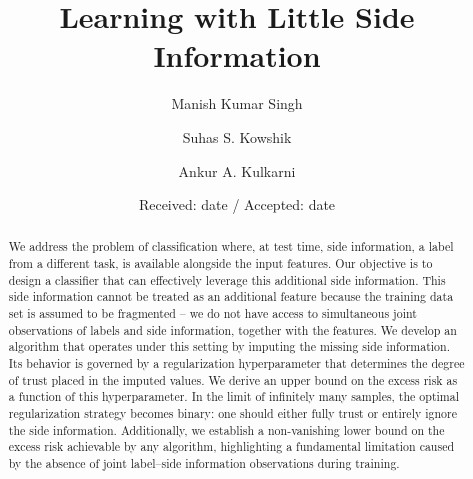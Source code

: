 \documentclass[smallextended]{svjour3}       %
\begin{document}
\title{Learning with Little Side Information}

\author{Manish Kumar Singh \and Suhas S. Kowshik \and Ankur A. Kulkarni}


\date{Received: date / Accepted: date}
\maketitle

\begin{abstract}
We address the problem of classification where, at test time, side information, a label from a different task, is available alongside the input features. Our objective is to design a classifier that can effectively leverage this additional side information. This side information cannot be treated as an additional feature because the training data set is assumed to be fragmented -- we do not have access to simultaneous joint observations of labels and side information, together with the features. We develop an algorithm that operates under this setting by imputing the missing side information. Its behavior is governed by a regularization hyperparameter that determines the degree of trust placed in the imputed values. We derive an upper bound on the excess risk as a function of this hyperparameter.
In the limit of infinitely many samples, the optimal regularization strategy becomes binary: one should either fully trust or entirely ignore the side information. Additionally, we establish a non-vanishing lower bound on the excess risk achievable by any algorithm, highlighting a fundamental limitation caused by the absence of joint label--side information observations during training.
\end{abstract}


\end{document}

